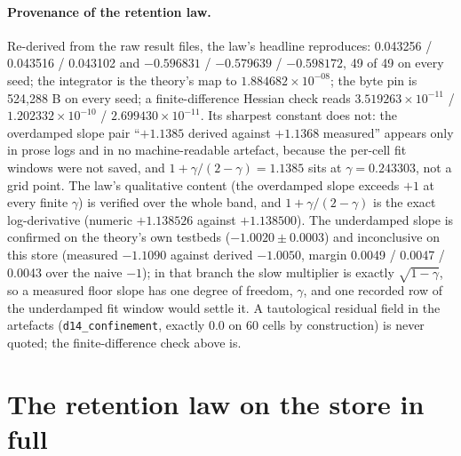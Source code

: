 \documentclass{article} %
\newcommand{\sci}[2]{\ensuremath{#1\times10^{#2}}}
\begin{document}
\paragraph{Provenance of the retention law.} Re-derived from the raw result files, the law's
headline reproduces: 0.043256 / 0.043516 / 0.043102 and $-0.596831$ / $-0.579639$ / $-0.598172$,
49 of 49 on every seed; the integrator is the theory's map to \sci{1.884682}{-08}; the byte pin is
524,288 B on every seed; a finite-difference Hessian check reads \sci{3.519263}{-11} /
\sci{1.202332}{-10} / \sci{2.699430}{-11}. %
Its sharpest constant does not: the overdamped slope pair ``$+1.1385$ derived against $+1.1368$
measured'' appears only in prose logs and in no machine-readable artefact, because the per-cell fit
windows were not saved, and $1+\gamma/(2-\gamma)=1.1385$ sits at $\gamma=0.243303$, not a grid
point. The law's qualitative content (the overdamped slope exceeds $+1$ at every finite $\gamma$)
is verified over the whole band, and $1+\gamma/(2-\gamma)$ is the exact log-derivative (numeric
$+1.138526$ against $+1.138500$). The underdamped slope is confirmed on the theory's own testbeds
($-1.0020\pm0.0003$) and inconclusive on this store (measured $-1.1090$ against derived $-1.0050$,
margin 0.0049 / 0.0047 / 0.0043 over the naive $-1$); in that branch the slow multiplier is exactly
$\sqrt{1-\gamma}$, so a measured floor slope has one degree of freedom, $\gamma$, and one recorded row
of the underdamped fit window would settle it. A tautological residual field in the artefacts
(\texttt{d14\_confinement}, exactly 0.0 on 60 cells by construction) is never quoted; the
finite-difference check above is. %

\section{The retention law on the store in full}
\label{app:physics}
\end{document}
